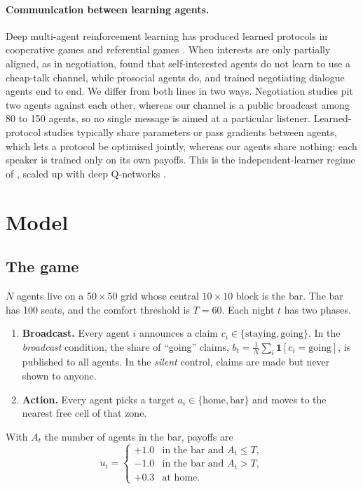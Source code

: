 \documentclass[11pt]{article}
\begin{document}
\paragraph{Communication between learning agents.}
Deep multi-agent reinforcement learning has produced learned protocols in cooperative games \citep{foerster2016,sukhbaatar2016} and referential games \citep{lazaridou2017}. When interests are only partially aligned, as in negotiation, \citet{cao2018} found that self-interested agents do not learn to use a cheap-talk channel, while prosocial agents do, and \citet{lewis2017} trained negotiating dialogue agents end to end. We differ from both lines in two ways. Negotiation studies pit two agents against each other, whereas our channel is a public broadcast among 80 to 150 agents, so no single message is aimed at a particular listener. Learned-protocol studies typically share parameters or pass gradients between agents, which lets a protocol be optimised jointly, whereas our agents share nothing: each speaker is trained only on its own payoffs. This is the independent-learner regime of \citet{tan1993}, scaled up with deep Q-networks \citep{mnih2015}.

\section{Model}\label{sec:model}

\subsection{The game}

$N$ agents live on a $50 \times 50$ grid whose central $10 \times 10$ block is the bar. The bar has 100 seats, and the comfort threshold is $T = 60$. Each night $t$ has two phases.

\begin{enumerate}
  \item \textbf{Broadcast.} Every agent $i$ announces a claim $c_i \in \{\text{staying}, \text{going}\}$. In the \emph{broadcast} condition, the share of ``going'' claims, $b_t = \frac{1}{N}\sum_i \mathbf{1}[c_i = \text{going}]$, is published to all agents. In the \emph{silent} control, claims are made but never shown to anyone.
  \item \textbf{Action.} Every agent picks a target $a_i \in \{\text{home}, \text{bar}\}$ and moves to the nearest free cell of that zone.
\end{enumerate}

With $A_t$ the number of agents in the bar, payoffs are
\begin{equation}
u_i =
\begin{cases}
+1.0 & \text{in the bar and } A_t \le T,\\
-1.0 & \text{in the bar and } A_t > T,\\
+0.3 & \text{at home.}
\end{cases}
\end{equation}
\end{document}
